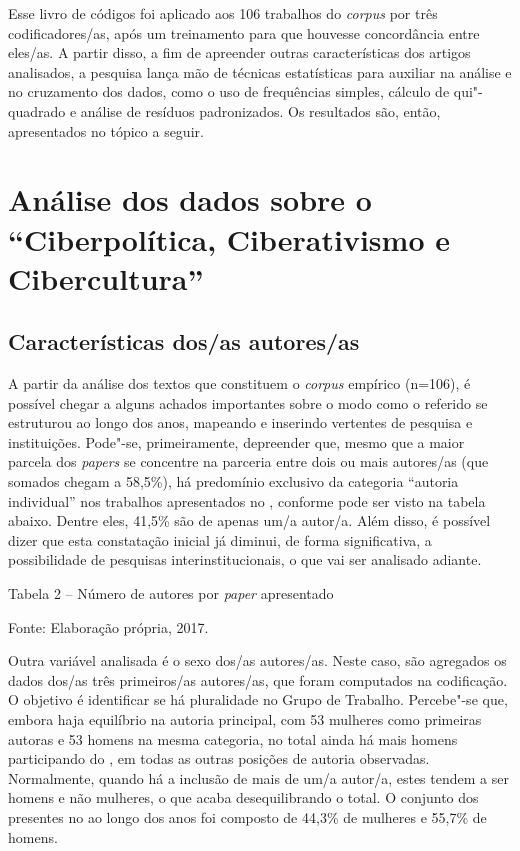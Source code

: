 Esse livro de códigos foi aplicado aos 106 trabalhos do \emph{corpus}
por três codificadores/as, após um treinamento para que houvesse
concordância entre eles/as. A partir disso, a fim de apreender outras
características dos artigos analisados, a pesquisa lança mão de técnicas
estatísticas para auxiliar na análise e no cruzamento dos dados, como o
uso de frequências simples, cálculo de qui"-quadrado e análise de
resíduos padronizados. Os resultados são, então, apresentados no tópico
a seguir.

\section{Análise dos dados sobre o  ``Ciberpolítica, Ciberativismo e
Cibercultura''}

\subsection{Características dos/as autores/as}

A partir da análise dos textos que constituem o \emph{corpus} empírico
(n=106), é possível chegar a alguns achados importantes sobre o modo
como o referido  se estruturou ao longo dos anos, mapeando e inserindo
vertentes de pesquisa e instituições. Pode"-se, primeiramente, depreender
que, mesmo que a maior parcela dos \emph{papers} se concentre na
parceria entre dois ou mais autores/as (que somados chegam a 58,5\%), há
predomínio exclusivo da categoria ``autoria individual'' nos trabalhos
apresentados no , conforme pode ser visto na tabela abaixo. Dentre
eles, 41,5\% são de apenas um/a autor/a. Além disso, é possível dizer
que esta constatação inicial já diminui, de forma significativa, a
possibilidade de pesquisas interinstitucionais, o que vai ser analisado
adiante.

Tabela 2 -- Número de autores por \emph{paper} apresentado

Fonte: Elaboração própria, 2017.

Outra variável analisada é o sexo dos/as autores/as. Neste caso, são
agregados os dados dos/as três primeiros/as autores/as, que foram
computados na codificação. O objetivo é identificar se há pluralidade no
Grupo de Trabalho. Percebe"-se que, embora haja equilíbrio na autoria
principal, com 53 mulheres como primeiras autoras e 53 homens na mesma
categoria, no total ainda há mais homens participando do , em todas as
outras posições de autoria observadas. Normalmente, quando há a inclusão
de mais de um/a autor/a, estes tendem a ser homens e não mulheres, o que
acaba desequilibrando o total. O conjunto dos presentes no  ao longo
dos anos foi composto de 44,3\% de mulheres e 55,7\% de homens.


